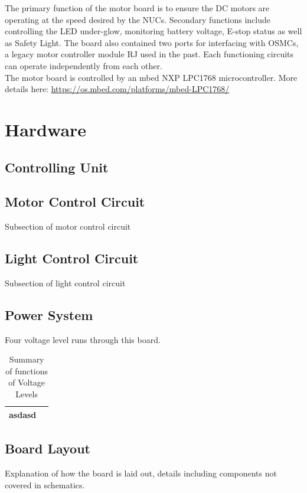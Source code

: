\documentclass[letterpaper, 12pt]{article}
\begin{document}
The primary function of the motor board is to ensure the DC motors are operating at the speed desired by the NUCs. Secondary functions include controlling the LED under-glow, monitoring battery voltage, E-stop status as well as Safety Light. The board also contained two ports for interfacing with OSMCs, a legacy motor controller module RJ used in the past. Each functioning circuits can operate independently from each other. \vspace{6pt}\\
The motor board is controlled by an mbed NXP LPC1768 microcontroller. More details here: \url{https://os.mbed.com/platforms/mbed-LPC1768/} \vspace{6pt}\\


\section{Hardware}
\subsection{Controlling Unit}
\subsection{Motor Control Circuit}
Subsection of motor control circuit 
\pagebreak
\subsection{Light Control Circuit}
Subsection of light control circuit
\pagebreak
\subsection{Power System}
Four voltage level runs through this board. 

\begin{table}[h]
\caption{Summary of functions of Voltage Levels}
\centering
\begin{tabular}{p{2cm}p{2cm}}
\toprule
\midrule
asdasd\\
\bottomrule
\end{tabular}
\end{table}

\pagebreak
\subsection{Board Layout}
Explanation of how the board is laid out, details including components not covered in schematics. 
\pagebreak
\end{document}
